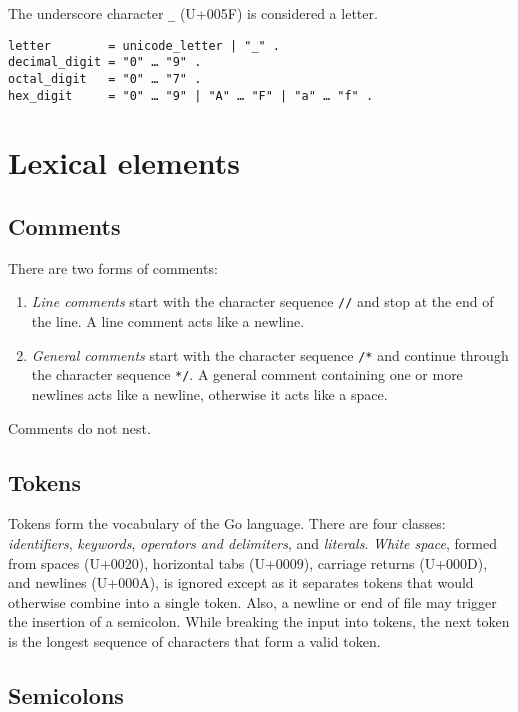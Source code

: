The underscore character \texttt{\_} (U+005F) is considered a letter.

\begin{Verbatim}[frame=single]
letter        = unicode_letter | "_" .
decimal_digit = "0" … "9" .
octal_digit   = "0" … "7" .
hex_digit     = "0" … "9" | "A" … "F" | "a" … "f" .
\end{Verbatim}

\section*{Lexical elements}

\subsection*{Comments}

There are two forms of comments:

\begin{enumerate}
\item
  \emph{Line comments} start with the character sequence \texttt{//} and
  stop at the end of the line. A line comment acts like a newline.
\item
  \emph{General comments} start with the character sequence \texttt{/*}
  and continue through the character sequence \texttt{*/}. A general
  comment containing one or more newlines acts like a newline, otherwise
  it acts like a space.
\end{enumerate}

Comments do not nest.

\subsection*{Tokens}

Tokens form the vocabulary of the Go language. There are four classes:
\emph{identifiers}, \emph{keywords}, \emph{operators and delimiters},
and \emph{literals}. \emph{White space}, formed from spaces (U+0020),
horizontal tabs (U+0009), carriage returns (U+000D), and newlines
(U+000A), is ignored except as it separates tokens that would otherwise
combine into a single token. Also, a newline or end of file may trigger
the insertion of a semicolon. While breaking the
input into tokens, the next token is the longest sequence of characters
that form a valid token.

\subsection*{Semicolons}

